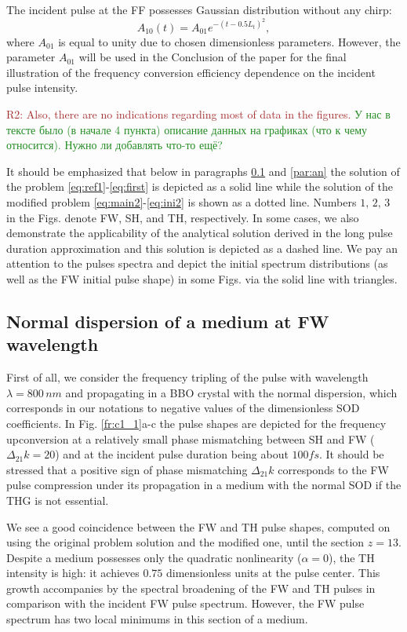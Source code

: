 \documentclass[a4paper, 12pt, onecolumn]{extarticle}
\begin{document}
The incident pulse at the FF possesses Gaussian distribution without any chirp:
\begin{equation}
A_{10}(t)=A_{01}e^{-(t-0.5L_t)^2},
\end{equation}
where \(A_{01}\) is equal to unity due to chosen dimensionless parameters. However, the parameter \(A_{01}\) will be used in the Conclusion of the paper for the final illustration of the frequency conversion efficiency dependence on the incident pulse intensity.

\textcolor{brown}{R2: Also, there are no indications regarding most of data in the figures.} \textcolor{ForestGreen}{У нас в тексте было (в начале 4 пункта) описание данных на графиках (что к чему относится). Нужно ли добавлять что-то ещё?}

It should be emphasized that below in paragraphs \ref{par:nor} and \ref{par:an} the solution of the problem \eqref{eq:ref1}-\eqref{eq:first} is depicted as a solid line while the solution of the modified problem  \eqref{eq:main2}-\eqref{eq:ini2} is shown as a dotted line.  Numbers \(1,\,2,\,3\) in the Figs. denote FW, SH, and TH, respectively. In some cases, we also demonstrate the applicability of the analytical solution derived in the long pulse duration approximation and this solution is depicted as a dashed line. We pay an attention to the pulses spectra and depict the initial spectrum distributions (as well as the FW initial pulse shape) in some Figs. via the solid line with triangles.

\subsection{Normal dispersion of a medium at FW wavelength}
\label{par:nor}
First of all, we consider the frequency tripling of the pulse with wavelength \(\lambda=800\,nm\) and propagating in a BBO crystal with the normal dispersion, which corresponds in our notations to negative values of the dimensionless SOD coefficients. In Fig. \ref{fr:c1_1}a-c the pulse shapes are depicted for the frequency upconversion at a relatively small phase mismatching between SH and FW (\(\Delta_{21}k=20\)) and at the incident pulse duration being about \(100fs\). It should be stressed that a positive sign of phase mismatching \(\Delta_{21}k\) corresponds to the FW pulse compression under its propagation in a medium with the normal SOD if the THG is not essential.

We see a good coincidence between the FW and TH pulse shapes, computed on using the original problem solution and the modified one, until the section \(z=13\). Despite a medium possesses only the quadratic nonlinearity (\(\alpha=0\)), the TH intensity is high: it achieves \(0.75\) dimensionless units at the pulse center. This growth accompanies by the spectral broadening of the FW and TH pulses in comparison with the incident FW pulse spectrum. However, the FW pulse spectrum has two local minimums in this section of a medium. 
\end{document}
